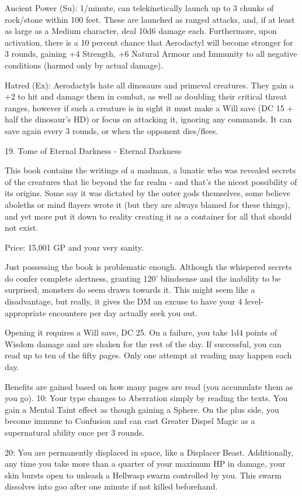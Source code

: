 \begin{multicols}{2}
Ancient Power (Su):
1/minute, can telekinetically launch up to 3 chunks of rock/stone within 100 feet. These are launched as ranged attacks, and, if at least as large as a Medium character, deal 10d6 damage each.
Furthermore, upon activation, there is a 10 percent chance that Aerodactyl will become stronger for 3 rounds, gaining +4 Strength, +6 Natural Armour and Immunity to all negative conditions (harmed only by actual damage).

Hatred (Ex):
Aerodactyls hate all dinosaurs and primeval creatures. They gain a +2 to hit and damage them in combat, as well as doubling their critical threat ranges, however if such a creature is in sight it must make a Will save (DC 15 + half the dinosaur's HD) or focus on attacking it, ignoring any commands. It can save again every 3 rounds, or when the opponent dies/flees.


19. Tome of Eternal Darkness - Eternal Darkness

This book contains the writings of a madman, a lunatic who was revealed secrets of the creatures that lie beyond the far realm - and that's the nicest possibility of its origins. Some say it was dictated by the outer gods themselves, some believe aboleths or mind flayers wrote it (but they are always blamed for these things), and yet more put it down to reality creating it as a container for all that should not exist.

Price: 15,001 GP and your very sanity.

Just possessing the book is problematic enough. Although the whispered secrets do confer complete alertness, granting 120' blindsense and the inability to be surprised, monsters do seem drawn towards it. This might seem like a disadvantage, but really, it gives the DM an excuse to have your 4 level-appropriate encounters per day actually seek you out.

Opening it requires a Will save, DC 25. On a failure, you take 1d4 points of Wisdom damage and are shaken for the rest of the day. If successful, you can read up to ten of the fifty pages. Only one attempt at reading may happen each day.

Benefits are gained based on how many pages are read (you accumulate them as you go).
10: Your type changes to Aberration simply by reading the texts. You gain a Mental Taint effect as though gaining a Sphere. On the plus side, you become immune to Confusion and can cast Greater Dispel Magic as a supernatural ability once per 3 rounds.

20: You are permanently displaced in space, like a Displacer Beast. Additionally, any time you take more than a quarter of your maximum HP in damage, your skin bursts open to unleash a Hellwasp swarm controlled by you. This swarm dissolves into goo after one minute if not killed beforehand.


\end{multicols}
